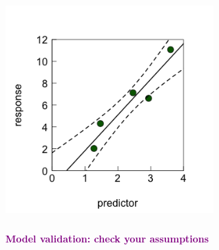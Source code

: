\documentclass{beamer}
\begin{document}
\begin{frame}
    \centering\includegraphics[width=0.6\textwidth]{lectures/day_2_LM_refresh_I/figures/unnamed-chunk-35-1.png}            
        
    \scalebox{0.7}{
        
    }    
    
\end{frame}

\begin{frame}
    \frametitle{}
    \begin{center}
        \huge\textbf{\textcolor{purple}{Model validation: check your assumptions}}
    \end{center}
\end{frame}
\end{document}
